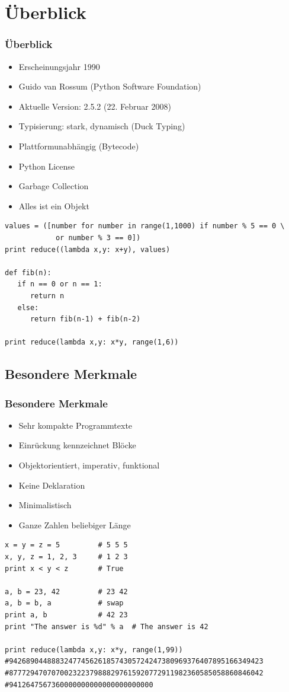 \documentclass[10pt]{beamer}
\begin{document}
\section{Überblick}
 \begin{frame}[fragile]
  \frametitle{Überblick}
   \begin{itemize}
    \item Erscheinungsjahr 1990
    \item Guido van Rossum (Python Software Foundation)
    \item Aktuelle Version: 2.5.2 (22. Februar 2008)
    \item Typisierung: stark, dynamisch (Duck Typing)
    \item Plattformunabhängig (Bytecode)
    \item Python License
    \item Garbage Collection
    \item Alles ist ein Objekt
   \end{itemize}
   \begin{lstlisting}
values = ([number for number in range(1,1000) if number % 5 == 0 \
            or number % 3 == 0])
print reduce((lambda x,y: x+y), values)

def fib(n):
   if n == 0 or n == 1:
      return n
   else:
      return fib(n-1) + fib(n-2)

print reduce(lambda x,y: x*y, range(1,6))
   \end{lstlisting}
\end{frame}

\subsection{Besondere Merkmale}
 \begin{frame}[fragile]
  \frametitle{Besondere Merkmale}
   \begin{itemize}
    \item Sehr kompakte Programmtexte
    \item Einrückung kennzeichnet Blöcke
    \item Objektorientiert, imperativ, funktional
    \item Keine Deklaration
    \item Minimalistisch
    \item Ganze Zahlen beliebiger Länge
   \end{itemize}
   \begin{lstlisting}
x = y = z = 5         # 5 5 5
x, y, z = 1, 2, 3     # 1 2 3
print x < y < z       # True

a, b = 23, 42         # 23 42
a, b = b, a           # swap
print a, b            # 42 23
print "The answer is %d" % a  # The answer is 42

print reduce(lambda x,y: x*y, range(1,99))
#942689044888324774562618574305724247380969376407895166349423
#877729470707002322379888297615920772911982360585058860846042
#9412647567360000000000000000000000   
   \end{lstlisting}
\end{frame}
\end{document}
